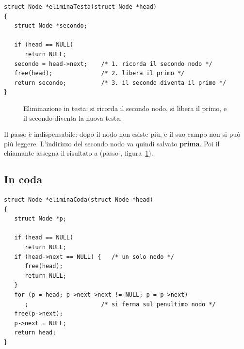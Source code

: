 \begin{lstlisting}[style=c, name=lista.c]
struct Node *eliminaTesta(struct Node *head)
{
   struct Node *secondo;

   if (head == NULL)
      return NULL;
   secondo = head->next;    /* 1. ricorda il secondo nodo */
   free(head);              /* 2. libera il primo */
   return secondo;          /* 3. il secondo diventa il primo */
}
\end{lstlisting}

\begin{figure}[H]
  \centering
  \caption{Eliminazione in testa: si ricorda il secondo nodo, si libera il
           primo, e il secondo diventa la nuova testa.}
  \label{fig:el-testa}
\end{figure}

Il passo  è indispensabile: dopo  il nodo non
esiste più, e il suo campo  non si può più leggere. L'indirizzo
del secondo nodo va quindi salvato \textbf{prima}. Poi il chiamante assegna
il risultato a  (passo , figura~\ref{fig:el-testa}).

\subsection{In coda}

\begin{lstlisting}[style=c, name=lista.c]
struct Node *eliminaCoda(struct Node *head)
{
   struct Node *p;

   if (head == NULL)
      return NULL;
   if (head->next == NULL) {   /* un solo nodo */
      free(head);
      return NULL;
   }
   for (p = head; p->next->next != NULL; p = p->next)
      ;                     /* si ferma sul penultimo nodo */
   free(p->next);
   p->next = NULL;
   return head;
}
\end{lstlisting}

